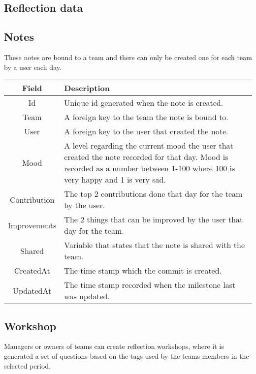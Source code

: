 \subsection{Reflection data}
\subsection*{Notes}
These notes are bound to a team and there can only be created one for each team by a user each day. \\

\vspace{0.5cm}
\begin{tabularx}{\linewidth}{| c | X |}
    \hline
    \rowcolor[gray]{0.8}
    \textbf{Field} & \textbf{Description} \\
    \hline
    Id & Unique id generated when the note is created.\\ \hline
    Team & A foreign key to the team the note is bound to.\\ \hline
   	User & A foreign key to the user that created the note.\\ \hline
   	Mood & A level regarding the current mood the user that created the note recorded for that day. Mood is recorded as a number between 1-100 where 100 is very happy and 1 is very sad.\\ \hline
   	Contribution & The top 2 contributions done that day for the team by the user.\\ \hline
   	Improvements & The 2 things that can be improved by the user that day for the team.\\ \hline
   	Shared & Variable that states that the note is shared with the team.\\ \hline
    CreatedAt & The time stamp which the commit is created.\\ \hline
    UpdatedAt & The time stamp recorded when the milestone last was updated.\\ 
    \hline
\end{tabularx}
\vspace{0.5cm}

\subsection*{Workshop}
Managers or owners of teams can create reflection workshops, where it is generated a set of questions based on the tags used by the teams members in the selected period. \\

